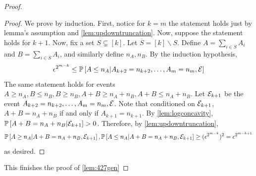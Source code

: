 \begin{proof}
\begin{proof}
We prove by induction. 
First, notice for $k=m$ the statement holds just by lemma's assumption and \cref{lem:updowntruncation}.
Now, suppose the statement holds for $k+1$.
Now, fix a set $S\subsetneq [k]$. %
 Let $\overline{S}=[k]\smallsetminus S$.
Define $A=\sum_{i\in S} A_i$ and $B=\sum_{i\in \overline{S}} A_i$, and similarly define $n_A,n_B$.
 By the induction hypothesis,
 $$ \eps^{2^{m-k}}\leq \P{A\leq n_A | A_{k+2}=n_{k+2},\dots,A_m=n_m,\cE} %
 $$
 The same statement holds for events $A\geq n_A, 
 B\leq n_B, B\geq n_B, A+B\geq n_A+n_B, A+B\leq n_A+n_B$.
Let ${\cal E}_{k+1}$ be the event $A_{k+2}=n_{k+2},\dots,A_m=n_m, {\cal E}$. Note that conditioned on ${\cal E}_{k+1}$,  $A+B=n_A+n_B$  if and only if $A_{k+1}=n_{k+1}$. 
 By \cref{lem:logconcavity}, ${\mathbb{P}}\left[A+B=n_A+n_B| {\cal E}_{k+1}\right]>0$. Therefore,
 by \cref{lem:updowntruncation},
$$ {\mathbb{P}}\left[A\geq n_A | A+B=n_A+n_B, {\cal E}_{k+1}\right], {\mathbb{P}}\left[A\leq n_A | A+B=n_A+n_B, {\cal E}_{k+1}\right] \geq ({\epsilon}^{2^{m-k}})^2={\epsilon}^{2^{m-k+1}}$$
as desired. 
\end{proof}
This finishes the proof of \cref{lem:427gen}
\end{proof}


